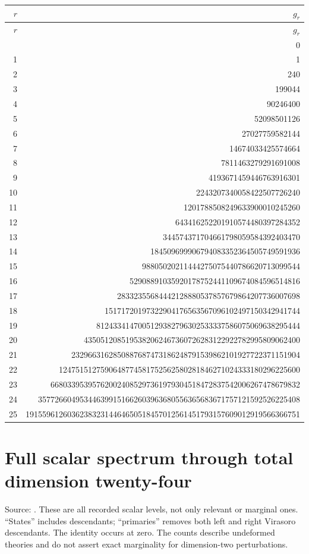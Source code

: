 \begingroup\scriptsize
\setlength{\tabcolsep}{5pt}
\begin{longtable}{@{}rr@{}}
\toprule
$r$ & $g_r$\\
\midrule\endfirsthead
\toprule
$r$ & $g_r$\\
\midrule\endhead
\bottomrule\endfoot
0 & 0\\
1 & 1\\
2 & 240\\
3 & 199044\\
4 & 90246400\\
5 & 52098501126\\
6 & 27027759582144\\
7 & 14674033425574664\\
8 & 7811463279291691008\\
9 & 4193671459446763916301\\
10 & 2243207340058422507726240\\
11 & 1201788508249633900010245260\\
12 & 643416252201910574480397284352\\
13 & 344574371704661798059584392403470\\
14 & 184509699906794083352364505749591936\\
15 & 98805020211444275075440786620713099544\\
16 & 52908891035920178752441109674084596514816\\
17 & 28332355684442128880537857679864207736007698\\
18 & 15171720197322904176563567096102497150342941744\\
19 & 8124334147005129382796302533337586075069638295444\\
20 & 4350512085195382062467360726283122922782995809062400\\
21 & 2329663162850887687473186248791539862101927722371151904\\
22 & 1247515127590648774581752562580281846271024333180296225600\\
23 & 668033953957620024085297361979304518472837542006267478679832\\
24 & 357726604953446399151662603963680556365683671757121592526225408\\
25 & 191559612603623832314464650518457012561451793157609012919566366751\\
\end{longtable}
\endgroup
\section{Full scalar spectrum through total dimension twenty-four}
\label{expdata:scalars}
Source: .
These are all recorded scalar levels, not only relevant or marginal
ones. ``States'' includes descendants; ``primaries'' removes both
left and right Virasoro descendants. The identity occurs at zero.
The counts describe undeformed theories and do not assert exact
marginality for dimension-two perturbations.

